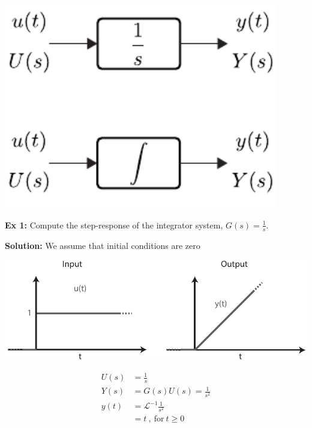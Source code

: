 \documentclass[twoside]{article}
\begin{document}
    \begin{center}    
        \begin{minipage}[h]{0.5\linewidth}
    \begin{center}
      \includegraphics[width=0.9\textwidth]{int}
    \end{center}
  \end{minipage}
      \end{center}
      
      \textbf{Ex 1:} Compute the step-response of the integrator system, $G(s) = \frac{1}{s}$.
      
      \textbf{Solution:} We assume that initial conditions are zero
      
          \begin{minipage}[h]{0.7\linewidth}
    \begin{center}
      \includegraphics[width=1\textwidth]{signals}
    \end{center}
  \end{minipage}
    \begin{minipage}[h]{0.3\linewidth}
    \begin{center}
      \begin{align*}
      	U(s) &= \frac{1}{s} 
	\\
	Y(s) &= G(s) U(s) = \frac{1}{s^2}  
	\\
	y(t) &= \mathcal{L}^{-1}{ \frac{1}{s^2}  }
	\\
	&= t \ , \ \mathrm{for} \ t \geq 0
      \end{align*}
    \end{center}
  \end{minipage}
     
\end{document}
